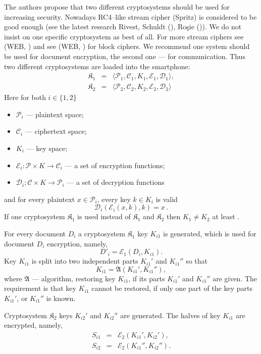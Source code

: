 \documentclass{bjmc}
\begin{document}
The authors propose that two different cryptosystems should be used for increasing security. 
Nowadays RC4--like stream cipher (Spritz) is considered to be good enough (see the latest research  Rivest,  Schuldt (\cite{Sp}), Ro\c sie (\cite{Ro})).   
 We do not insist on one specific cryptosystem as best of all.
For more stream ciphers see (WEB, \cite{eS}) and see (WEB, \cite{Bl}) for block ciphers. We recommend one system should be used for document encryption, the second one --- 
for communication.
Thus two different cryptosystems are loaded into the smartphone:
\begin{eqnarray*}
\mathfrak{K}_1&=&\langle \mathcal{P}_1, \mathcal{C}_1, K_1, \mathcal{E}_1, \mathcal{D}_1 \rangle,\\
\mathfrak{K}_2&=&\langle \mathcal{P}_2, \mathcal{C}_2, K_2, \mathcal{E}_2, \mathcal{D}_2 \rangle
\end{eqnarray*}
Here for both $i\in\{1,2\}$
\begin{itemize}
\item $\mathcal{P}_i$ --- plaintext space;
\item $\mathcal{C}_i$ --- ciphertext space;
\item $K_i$ --- key space;
\item  $\mathcal{E}_i:\mathcal{P}\times K\to \mathcal{C}_i $ --- a set of encryption functions; 
\item $\mathcal{D}_i:\mathcal{C}\times K\to \mathcal{P}_i $ --- a set of decryption functions
\end{itemize} 
and for every plaintext $x\in \mathcal{P}_i$, every key $k\in K_i$ is valid
 \begin{equation*} \label{f01}
\mathcal{D}_i(\mathcal{E}_i(x,k),k)=x\,.
\end{equation*}
If one cryptosystem $\mathfrak{K}_1$ is used instead of $\mathfrak{K}_1$ and $\mathfrak{K}_2$ then $K_1\not= K_2$ at least .

For every document $D_i$ a cryptosystem $\mathfrak{K}_1$ key $K_{i1}$ is generated, which is used for document $D_i$ encryption, namely,
\[
D'_i=\mathcal{E}_1(D_i,K_{i1}).
\]
Key $K_{i1}$ is split into two independent parts $K_{i1}'$  and $K_{i1}''$ so that 
\[
K_{i1}=\mathfrak{A}(K_{i1}',K_{i1}''),
\]
where $\mathfrak{A}$ --- algorithm, restoring  key $K_{i1}$, if its parts $K_{i1}'$ and $K_{i1}''$ are given.
The requirement is that key $K_{i1}$ cannot be restored, if only one part of the key parts  $K_{i1}'$, or $K_{i1}''$ is known.

 Cryptosystem $\mathfrak{K}_2$ keys $K_{i2}'$ and $K_{i2}''$ are generated. The halves of  key $K_{i1}$ are encrypted, namely,
\begin{eqnarray*}
S_{i1}&=&\mathcal{E}_2(K_{i1}',K_{i2}'),\\
S_{i2}&=&\mathcal{E}_2(K_{i1}'',K_{i2}'').
\end{eqnarray*}
\end{document}
